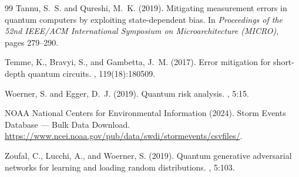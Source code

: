 \documentclass[11pt,a4paper]{article}
\begin{document}
\begin{thebibliography}{99}
Tannu, S.~S. and Qureshi, M.~K. (2019).
\newblock Mitigating measurement errors in quantum computers by exploiting state-dependent bias.
\newblock In {\em Proceedings of the 52nd IEEE/ACM International Symposium on Microarchitecture (MICRO)}, pages 279--290.

Temme, K., Bravyi, S., and Gambetta, J.~M. (2017).
\newblock Error mitigation for short-depth quantum circuits.
, 119(18):180509.

Woerner, S. and Egger, D.~J. (2019).
\newblock Quantum risk analysis.
, 5:15.

NOAA National Centers for Environmental Information (2024).
\newblock Storm Events Database --- Bulk Data Download.
\newblock \url{https://www.ncei.noaa.gov/pub/data/swdi/stormevents/csvfiles/}.

Zoufal, C., Lucchi, A., and Woerner, S. (2019).
\newblock Quantum generative adversarial networks for learning and loading random distributions.
, 5:103.

\end{thebibliography}
\end{document}
